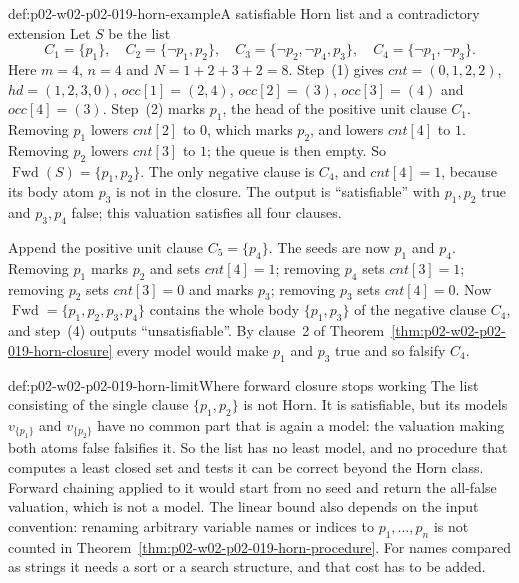 \begin{hbexample}{def:p02-w02-p02-019-horn-example}{A satisfiable Horn list and a contradictory extension}
Let \(S\) be the list
\[
 C_1=\{p_1\},\quad
 C_2=\{\neg p_1,p_2\},\quad
 C_3=\{\neg p_2,\neg p_4,p_3\},\quad
 C_4=\{\neg p_1,\neg p_3\}.
\]
Here \(m=4\), \(n=4\) and \(N=1+2+3+2=8\).  Step~(1) gives
\(\mathit{cnt}=(0,1,2,2)\), \(\mathit{hd}=(1,2,3,0)\),
\(\mathit{occ}[1]=(2,4)\), \(\mathit{occ}[2]=(3)\), \(\mathit{occ}[3]=(4)\)
and \(\mathit{occ}[4]=(3)\).  Step~(2) marks \(p_1\), the head of the
positive unit clause \(C_1\).  Removing \(p_1\) lowers \(\mathit{cnt}[2]\) to
\(0\), which marks \(p_2\), and lowers \(\mathit{cnt}[4]\) to \(1\).
Removing \(p_2\) lowers \(\mathit{cnt}[3]\) to \(1\); the queue is then empty.
So \(\operatorname{Fwd}(S)=\{p_1,p_2\}\).  The only negative clause is
\(C_4\), and \(\mathit{cnt}[4]=1\), because its body atom \(p_3\) is not in
the closure.  The output is ``satisfiable'' with
\(p_1,p_2\) true and \(p_3,p_4\) false; this valuation satisfies all four
clauses.

Append the positive unit clause \(C_5=\{p_4\}\).  The seeds are now \(p_1\)
and \(p_4\).  Removing \(p_1\) marks \(p_2\) and sets \(\mathit{cnt}[4]=1\);
removing \(p_4\) sets \(\mathit{cnt}[3]=1\); removing \(p_2\) sets
\(\mathit{cnt}[3]=0\) and marks \(p_3\); removing \(p_3\) sets
\(\mathit{cnt}[4]=0\).  Now \(\operatorname{Fwd}=\{p_1,p_2,p_3,p_4\}\)
contains the whole body \(\{p_1,p_3\}\) of the negative clause \(C_4\), and
step~(4) outputs ``unsatisfiable''.  By clause~2 of
Theorem~\ref{thm:p02-w02-p02-019-horn-closure} every model would make \(p_1\)
and \(p_3\) true and so falsify \(C_4\).
\end{hbexample}

\begin{hbwarning}{def:p02-w02-p02-019-horn-limit}{Where forward closure stops working}
The list consisting of the single clause \(\{p_1,p_2\}\) is not Horn.  It is
satisfiable, but its models \(v_{\{p_1\}}\) and \(v_{\{p_2\}}\) have no
common part that is again a model: the valuation making both atoms false
falsifies it.  So the list has no least model, and no procedure that computes
a least closed set and tests it can be correct beyond the Horn class.  Forward
chaining applied to it would start from no seed and return the all-false
valuation, which is not a model.
The linear bound also depends on the input convention: renaming arbitrary
variable names or indices to \(p_1,\ldots,p_n\) is not counted in
Theorem~\ref{thm:p02-w02-p02-019-horn-procedure}.  For names compared as
strings it needs a sort or a search structure, and that cost has to be added.
\end{hbwarning}

